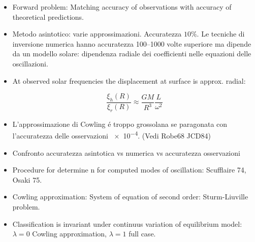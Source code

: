 \documentclass[oneside,12pt,fleqn]{memoir}
\begin{document}
{{\begin{itemize}
    Usando l'equazione di continuit\'a si vede che
    \begin{align*}
    &|\frac{\rho'}{\rho_0}|=\frac{v}{v_S}\\
    &|\frac{\rho'}{\rho_0}|\ll1\ \Rightarrow \ \frac{v}{v_S}\ll1
    \end{align*}
    La teoria lineare \'e valida finch\'e la velocit\'a delle fluttuazioni associata alle onde acustiche \'e minore rispetto alla velocit\'a del suono.
    Per l'equazione per la quantit\'a di moto linearizzata deve essere $\vec{c}\parallel \vec{k}$: la velocit\'a del fluido associato alle onde acustiche adiabatiche \'e parallela alla direzione di propagazione, sono ande di pressione.
    
    \item Forward problem: Matching accuracy of observations with accuracy of theoretical predictions.
    
    \item Metodo asintotico: varie approssimazioni. Accuratezza $10\%$. Le tecniche di inversione numerica hanno accuratezza \numrange{100}{1000} volte superiore ma dipende da un modello solare: dipendenza radiale dei coefficienti nelle equazioni delle oscillazioni.
    
    \item At observed solar frequencies the displacement at surface is approx. radial:
    
    \begin{equation*}
    \frac{\xi_h(R)}{\xi_r(R)}\approx\frac{GM}{R^3}\frac{L}{\omega^2}
    \end{equation*}
    
    \item L'approssimazione di Cowling \'e troppo grossolana se paragonata con l'accuratezza delle osservazioni \num{e-4}.
    (Vedi Robe68 JCD84)
    
    \item Confronto accuratezza asintotica vs numerica vs accuratezza osservazioni
    
    \item Procedure for determine n for computed modes of oscillation: Scufflaire 74, Osaki 75.
    
    \item Cowling approximation: System of equation of second order: Sturm-Liuville problem.
    \item Classification is invariant under continuus variation of equilibrium model: $\lambda=0$ Cowling approximation, $\lambda=1$ full case.
    

\end{itemize}}}
\end{document}
